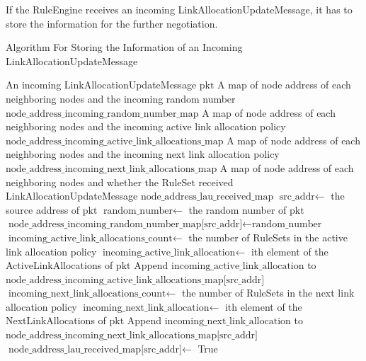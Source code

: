 If the RuleEngine receives an incoming LinkAllocationUpdateMessage, it has to store the information for the further negotiation.
\begin{algorithm}[H]  
  \begin{minipage}{0.8\linewidth}
  \caption{Algorithm For Storing the Information of an Incoming LinkAllocationUpdateMessage}                 
  \begin{algorithmic}[1]
    \Require An incoming LinkAllocationUpdateMessage $\text{pkt}$
    \Require  A map of node address of each neighboring nodes and the incoming random number $\text{node\_address\_incoming\_random\_number\_map}$
    \Require  A map of node address of each neighboring nodes and the incoming active link allocation policy $\text{node\_address\_incoming\_active\_link\_allocations\_map}$
    \Require  A map of node address of each neighboring nodes and the incoming next link allocation policy $\text{node\_address\_incoming\_next\_link\_allocations\_map}$
    \Require  A map of node address of each neighboring nodes and whether the RuleSet received LinkAllocationUpdateMessage $\text{node\_address\_lau\_received\_map}$
    \State $\text{src\_addr} \gets$ the source address of $\text{pkt}$
    \State $\text{random\_number} \gets$ the random number of $\text{pkt}$
    \State $\text{node\_address\_incoming\_random\_number\_map[src\_addr]} \gets \text{random\_number}$
    \State $\text{incoming\_active\_link\_allocations\_count} \gets$ the number of RuleSets in the active link allocation policy
      \State $\text{incoming\_active\_link\_allocation} \gets$ ith element of the ActiveLinkAllocations of $\text{pkt}$
      \State Append $\text{incoming\_active\_link\_allocation}$ to $\text{node\_address\_incoming\_active\_link\_allocations\_map[src\_addr]}$
    \EndFor
    \State $\text{incoming\_next\_link\_allocations\_count} \gets$ the number of RuleSets in the next link allocation policy
      \State $\text{incoming\_next\_link\_allocation} \gets$ ith element of the NextLinkAllocations of $\text{pkt}$
      \State Append $\text{incoming\_next\_link\_allocation}$ to $\text{node\_address\_incoming\_next\_link\_allocations\_map[src\_addr]}$
    \EndFor
    \State $\text{node\_address\_lau\_received\_map[src\_addr]} \gets$ True
  \end{algorithmic}
\end{minipage}
\end{algorithm}

